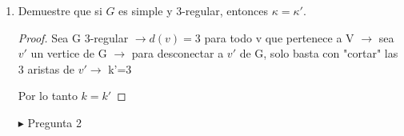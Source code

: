 \documentclass{article}
\begin{document}
\begin{enumerate}
\begin{proof}
   Hipótesis de inducción: supongamos para $\mathcal{T} = k$
   
   Supongamos que si $\mathcal{T} = k$ tal que existen i,j tal que $i \neq j$ e i,j pertenezen a $\left\lbrace 1,...,k \right\rbrace$ donde $T_i \cap T_j \neq \emptyset \rightarrow  \bigcap_{r=1}^{k}{T_r} \neq \emptyset$
   
   Paso inductivo: Pd para $\mathcal{T} = k+1$
   
   Pd si existen i,j tal que $i \neq j$ e i,j pertenezen a $\left\lbrace 1,...,k+1 \right\rbrace$ donde $T_i \cap T_j \neq \emptyset \rightarrow  \bigcap_{r=1}^{k+1}{T_r} \neq \emptyset$
   
   Dem (Reducción al absurdo)
   
   Supongamos $\bigcap_{r=1}^{k+1}{T_r} = \emptyset$ y existen i,j pertenezen a $\left\lbrace 1,...,k+1 \right\rbrace$ donde $T_i \cap T_j \neq \emptyset \rightarrow $ consideremos a T' como el subárbol formado por la unión de todos los subárboles de $T_1, T_2,...;T_{k+1}$ menos los subárboles $T_i$ y $T_j$. Es decir T'= $\bigcup_{r=1, r \neq i,  r \neq j }^{k+1}{T_r} \rightarrow T' \cap T_i \cap T_j = \emptyset$, pero por paso base esto es una contradicción $\rightarrow$ existe un x tal que x pertenece a  $\bigcap_{r=1}^{k+1}{T_r}$ 
   
   Por lo tanto la porposición es verdadera.
  \end{proof}
  

  Ejercicios de la tarea 5 
  

  
  $\blacktriangleright$ Pregunta 1 
  
  \item Demuestre que si $G$ es simple y $3$-regular, entonces $\kappa = \kappa'$.
  
  \begin{proof} 
  
  Sea G 3-regular $\rightarrow d(v)=3$ para todo v que pertenece a V $\rightarrow$ sea $v'$ un vertice de G  $\rightarrow$ para desconectar a $v'$ de G, solo basta  con "cortar" las 3 aristas de $v' \rightarrow$ k'=3
  
  Por lo tanto $k=k'$
  \end{proof}
  


  $\blacktriangleright$ Pregunta 2
  

\end{enumerate}
\end{document}
